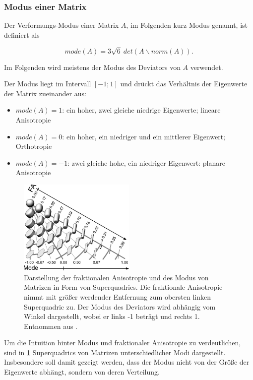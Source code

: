 \documentclass[a4paper,fontsize=12pt,toc=bib,parskip=half,ngerman]{scrartcl}
\begin{document}
\subsubsection{Modus einer Matrix}
Der Verformungs-Modus \cite{criscione2000invariant} einer Matrix $A$, im Folgenden kurz Modus genannt, ist definiert als

\begin{equation}
	mode(A) = 3\sqrt{6}~det(A\backslash norm(A)).
\end{equation}

Im Folgenden wird meistens der Modus des Deviators von $A$ verwendet.

Der Modus liegt im Intervall $[-1;1]$ und dr\"uckt das Verh\"altnis der Eigenwerte der Matrix zueinander aus:

\begin{itemize}
	\item $mode(A) = 1$: ein hoher, zwei gleiche niedrige Eigenwerte; lineare Anisotropie
	\item $mode(A) = 0$: ein hoher, ein niedriger und ein mittlerer Eigenwert; Orthotropie
	\item $mode(A) = -1$: zwei gleiche hohe, ein niedriger Eigenwert: planare Anisotropie
\end{itemize} 

\begin{figure}
	\centering
	\includegraphics[width=0.5\textwidth]{pictures/001.png}
	\caption{Darstellung der fraktionalen Anisotropie und des Modus von Matrizen in Form von Superquadrics\cite{kindlmann2004superquadric}. Die fraktionale Anisotropie nimmt mit gr\"o{\ss}er werdender Entfernung zum obersten linken Superquadric zu. Der Modus des Deviators wird abh\"angig vom Winkel dargestellt, wobei er links -1 betr\"agt und rechts 1. Entnommen aus \cite[S.~140]{ennis2006orthogonal}.}
	\label{Modus}
\end{figure}
Um die Intuition hinter Modus und fraktionaler Anisotropie zu verdeutlichen, sind in \cref{Modus} Superquadrics von Matrizen unterschiedlicher Modi dargestellt. Insbesondere soll damit gezeigt werden, dass der Modus nicht von der Gr\"o{\ss}e der Eigenwerte abh\"angt, sondern von deren Verteilung.
\end{document}
